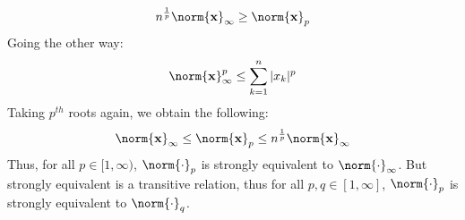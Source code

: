 \documentclass[crop=false,class=book,oneside]{standalone}                      %
\begin{document}
\begin{solution}[1]
\begin{equation}
                n^{\frac{1}{p}}\norm{\mathbf{x}}_{\infty}
                \geq\norm{\mathbf{x}}_{p}
            \end{equation}
            Going the other way:
            \begin{equation}
                \norm{\mathbf{x}}_{\infty}^{p}\leq
                \sum_{k=1}^{n}|x_{k}|^{p}
            \end{equation}
            Taking $p^{th}$ roots again, we obtain the following:
            \begin{equation}
                \norm{\mathbf{x}}_{\infty}\leq\norm{\mathbf{x}}_{p}
                \leq{n}^{\frac{1}{p}}\norm{\mathbf{x}}_{\infty}
            \end{equation}
            Thus, for all $p\in[1,\infty)$, $\norm{\cdot}_{p}$
            is strongly equivalent to $\norm{\cdot}_{\infty}$.
            But strongly equivalent is a transitive relation,
            thus for all $p,q\in[1,\infty]$, $\norm{\cdot}_{p}$
            is strongly equivalent to $\norm{\cdot}_{q}$.
        \end{solution}
\end{document}
